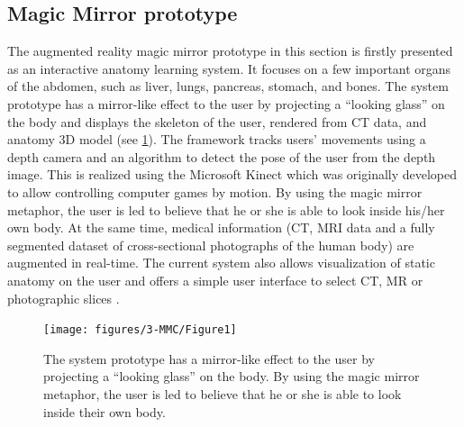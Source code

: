\subsection{Magic Mirror prototype}
The augmented reality magic mirror prototype in this section is firstly presented as an interactive anatomy learning system.%
It focuses on a few important organs of the abdomen, such as liver, lungs, pancreas, stomach, and bones.  
The system prototype has a mirror-like effect to the user by projecting a ``looking glass'' on the body and displays the skeleton of the user, rendered from CT data, and anatomy 3D model (see \figurename{\ref{fig:3-MMC:Prototype}}). 
The framework tracks users' movements using a depth camera and an algorithm to detect the pose of the user from the depth image. This is realized using the Microsoft Kinect which was originally developed to allow controlling computer games by motion. 
By using the magic mirror metaphor, the user is led to believe that he or she is able to look inside his/her own body. At the same time, medical information (CT, MRI data and a fully segmented dataset of cross-sectional photographs of the human body) are augmented in real-time. The current system also allows visualization of static anatomy on the user and offers a simple user interface to select CT, MR or photographic slices \cite{Blum2012,Navab2012a}.
\begin{figure}
	\centering
	\texttt{[image: figures/3-MMC/Figure1]}
	\caption[The Magic Mirror prototype.]{The system prototype has a mirror-like effect to the user by projecting a ``looking glass'' on the body. By using the magic mirror metaphor, the user is led to believe that he or she is able to look inside their own body.}
	\label{fig:3-MMC:Prototype}
\end{figure}


